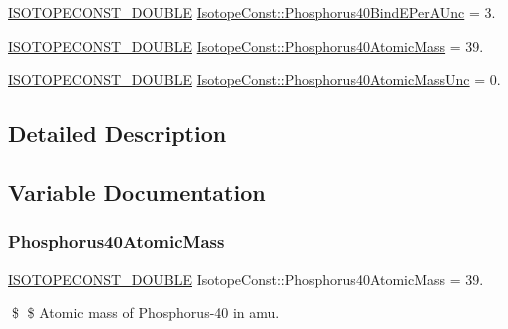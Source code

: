 \begin{DoxyCompactItemize}
\mbox{\hyperlink{group___isotope_const-_macros_ga8f45a7272ce02c0b4c65c44636ed719a}{I\+S\+O\+T\+O\+P\+E\+C\+O\+N\+S\+T\+\_\+\+D\+O\+U\+B\+LE}} \mbox{\hyperlink{group___isotope_const-_phosphorus-_p40_gab1f54602fbab81393876c9422099aa9a}{Isotope\+Const\+::\+Phosphorus40\+Bind\+E\+Per\+A\+Unc}} = 3.
\item 
\mbox{\hyperlink{group___isotope_const-_macros_ga8f45a7272ce02c0b4c65c44636ed719a}{I\+S\+O\+T\+O\+P\+E\+C\+O\+N\+S\+T\+\_\+\+D\+O\+U\+B\+LE}} \mbox{\hyperlink{group___isotope_const-_phosphorus-_p40_gac0e5221cdd384177ce7ce4bef639cd98}{Isotope\+Const\+::\+Phosphorus40\+Atomic\+Mass}} = 39.
\item 
\mbox{\hyperlink{group___isotope_const-_macros_ga8f45a7272ce02c0b4c65c44636ed719a}{I\+S\+O\+T\+O\+P\+E\+C\+O\+N\+S\+T\+\_\+\+D\+O\+U\+B\+LE}} \mbox{\hyperlink{group___isotope_const-_phosphorus-_p40_ga8c6d739f4dfc9ce8beb59a358b1705fa}{Isotope\+Const\+::\+Phosphorus40\+Atomic\+Mass\+Unc}} = 0.
\end{DoxyCompactItemize}


\subsection{Detailed Description}


\subsection{Variable Documentation}
\mbox{\label{group___isotope_const-_phosphorus-_p40_gac0e5221cdd384177ce7ce4bef639cd98}} 
\subsubsection{\texorpdfstring{Phosphorus40\+Atomic\+Mass}{Phosphorus40AtomicMass}}
{\footnotesize\ttfamily \mbox{\hyperlink{group___isotope_const-_macros_ga8f45a7272ce02c0b4c65c44636ed719a}{I\+S\+O\+T\+O\+P\+E\+C\+O\+N\+S\+T\+\_\+\+D\+O\+U\+B\+LE}} Isotope\+Const\+::\+Phosphorus40\+Atomic\+Mass = 39.}

\$ \$ Atomic mass of Phosphorus-\/40 in amu. \mbox{\label{group___isotope_const-_phosphorus-_p40_ga8c6d739f4dfc9ce8beb59a358b1705fa}} 
